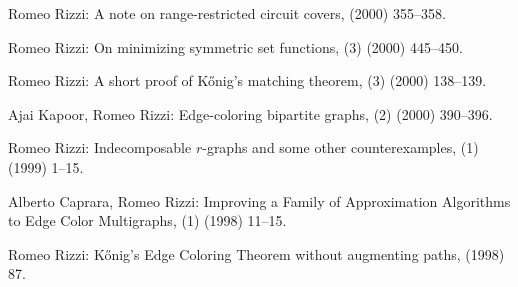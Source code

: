 \begin{etaremune}
  \item {\sc Romeo Rizzi:}
   \newblock  A note on range-restricted circuit covers,
    (2000) 355--358.

  \item {\sc Romeo Rizzi:}
   \newblock  On minimizing symmetric set functions,
   (3) (2000) 445--450.

  \item {\sc Romeo Rizzi:}
   \newblock  A short proof of K\H{o}nig's matching theorem,
   (3) (2000) 138--139.

  \item {\sc Ajai Kapoor, Romeo Rizzi:}
   \newblock  Edge-coloring bipartite graphs,
   (2) (2000) 390--396.

  \item {\sc Romeo Rizzi:}
   \newblock  Indecomposable $r$-graphs and some other counterexamples,
   (1) (1999) 1--15.

  \item {\sc Alberto Caprara, Romeo Rizzi:}  
   \newblock  Improving a Family of Approximation
              Algorithms to Edge Color Multigraphs,
   (1) (1998) 11--15.

  \item {\sc Romeo Rizzi:}
   \newblock  K\H{o}nig's Edge Coloring Theorem without augmenting paths,
    (1998) 87.

\end{etaremune}
